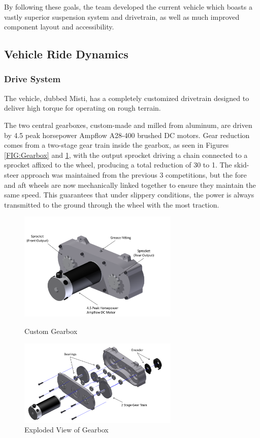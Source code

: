 By following these goals, the team developed the current vehicle which boasts a vastly superior suspension system and drivetrain, as well as much improved component layout and accessibility.

\subsection{Vehicle Ride Dynamics}
\subsubsection{Drive System}
The vehicle, dubbed Misti, has a completely customized drivetrain designed to deliver high torque for operating on rough terrain.

The two central gearboxes, custom-made and milled from aluminum, are driven by 4.5 peak horsepower Ampflow A28-400 brushed DC motors. Gear reduction comes from a two-stage gear train inside the gearbox, as seen in Figures \ref{FIG:Gearbox} and \ref{FIG:Explode}, with the output sprocket driving a chain connected to a sprocket affixed to the wheel, producing a total reduction of 30 to 1. The skid-steer approach was maintained from the previous 3 competitions, but the fore and aft wheels are now mechanically linked together to ensure they maintain the same speed. This guarantees that under slippery conditions, the power is always transmitted to the ground through the wheel with the most traction. 

\begin{figure}[H]
\begin{minipage}[b]{0.5\linewidth}
\centering
\includegraphics[width=3in]{./Pics/GearboxAssembled.png}
\caption{Custom Gearbox}
\label{FIG:Gearbox}
\end{minipage}
\hspace{0.1in}
\begin{minipage}[b]{0.5\linewidth}
\centering
\includegraphics[width=3in]{./Pics/GearboxExploded.png}
\caption{Exploded View of Gearbox}
\label{FIG:Explode}
\end{minipage}
\end{figure}


